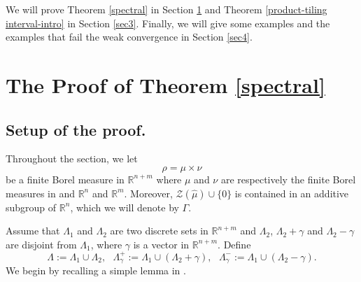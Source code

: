 \documentclass[reqno,a4paper,12pt]{amsart}
\numberwithin{equation}{section}
\newcommand{\R}{{\mathbb R}}
\newcounter{rem}
\theoremstyle{remark}
\numberwithin{equation}{section}
\def\R{\mathbb{R}}
\begin{document}
We will prove Theorem \ref{spectral} in Section \ref{sec2} and Theorem \ref{product-tiling interval-intro} in Section \ref{sec3}. Finally, we will give some examples and the examples that fail the weak convergence in Section \ref{sec4}.


\section{The Proof of Theorem \ref{spectral}}\label{sec2}

\subsection{Setup of the proof. } Throughout the section, we let
\begin{equation}\label{measure}
\rho = \mu\times \nu    
\end{equation}
be a finite Borel measure in $\R^{n+m}$ where $\mu$ and $\nu$ are respectively the finite Borel measures in  and $\R^n$ and $\R^m$. Moreover, ${\mathcal Z}(\widehat{\mu})\cup\{0\}$ is contained in an {additive} subgroup of $\R^n$, which we will denote by $\Gamma$.  

Assume that $\Lambda_{1}$ and $\Lambda_{2}$ are two discrete sets in $\mathbb{R}^{n+m}$  and $\Lambda_{2}$, $\Lambda_{2}+\gamma$ and $\Lambda_{2}-\gamma$ are disjoint from $\Lambda_{1}$, where $\gamma$ is a vector in $\mathbb{R}^{n+m}$.
Define
\begin{equation}\label{partition}
\Lambda:=\Lambda_{1}\cup \Lambda_{2},\ \ \ \Lambda^{+}_\gamma:=\Lambda_{1}\cup (\Lambda_{2}+\gamma),\ \ \ \Lambda^{-}_\gamma:=\Lambda_{1}\cup (\Lambda_{2}-\gamma).
\end{equation}
We begin by recalling a simple lemma  in \cite[Lemma 4.1]{GL-JFA}. 
\end{document}
